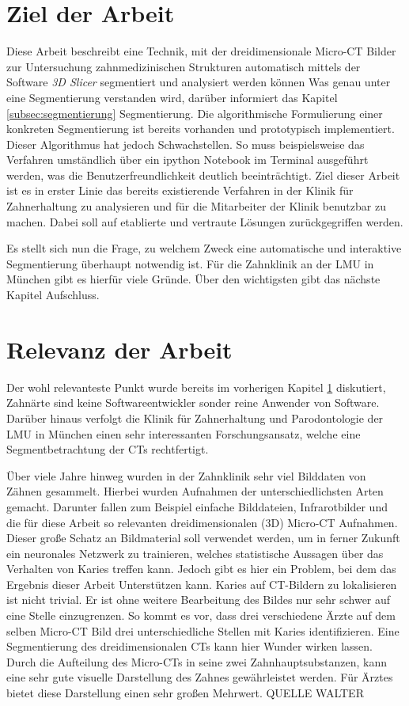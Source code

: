 \section{Ziel der Arbeit}
\label{sec:ziel_der_arbeit} Diese Arbeit beschreibt eine Technik, mit der
dreidimensionale Micro-CT Bilder zur Untersuchung zahnmedizinischen Strukturen
automatisch mittels der Software \textit{3D Slicer} segmentiert und analysiert werden
können Was genau unter eine Segmentierung verstanden wird, darüber informiert
das Kapitel \ref{subsec:segmentierung} Segmentierung. Die algorithmische Formulierung
einer konkreten Segmentierung ist bereits vorhanden und prototypisch implementiert.
Dieser Algorithmus hat jedoch Schwachstellen. So muss beispielsweise das Verfahren
umständlich über ein ipython Notebook im Terminal ausgeführt werden, was die
Benutzerfreundlichkeit deutlich beeinträchtigt. Ziel dieser Arbeit ist es in erster
Linie das bereits existierende Verfahren in der Klinik für Zahnerhaltung zu analysieren
und für die Mitarbeiter der Klinik benutzbar zu machen. Dabei soll auf
etablierte und vertraute Lösungen zurückgegriffen werden.

Es stellt sich nun die Frage, zu welchem Zweck eine automatische und interaktive
Segmentierung überhaupt notwendig ist. Für die Zahnklinik an der LMU in München
gibt es hierfür viele Gründe. Über den wichtigsten gibt das nächste Kapitel Aufschluss.

\section{Relevanz der Arbeit}
\label{sec:relevanz_der_arbeit} Der wohl relevanteste Punkt wurde bereits im vorherigen
Kapitel \ref{sec:ziel_der_arbeit} diskutiert, Zahnärte sind keine
Softwareentwickler sonder reine Anwender von Software. Darüber hinaus verfolgt die
Klinik für Zahnerhaltung und Parodontologie der LMU in München einen sehr interessanten
Forschungsansatz, welche eine Segmentbetrachtung der CTs rechtfertigt.

Über viele Jahre hinweg wurden in der Zahnklinik sehr viel Bilddaten von Zähnen
gesammelt. Hierbei wurden Aufnahmen der unterschiedlichsten Arten gemacht.
Darunter fallen zum Beispiel einfache Bilddateien, Infrarotbilder und die für diese
Arbeit so relevanten dreidimensionalen (3D) Micro-CT Aufnahmen. Dieser große
Schatz an Bildmaterial soll verwendet werden, um in ferner Zukunft ein neuronales
Netzwerk zu trainieren, welches statistische Aussagen über das Verhalten von
Karies treffen kann. Jedoch gibt es hier ein Problem, bei dem das Ergebnis
dieser Arbeit Unterstützen kann. Karies auf CT-Bildern zu lokalisieren ist nicht
trivial. Er ist ohne weitere Bearbeitung des Bildes nur sehr schwer auf eine
Stelle einzugrenzen. So kommt es vor, dass drei verschiedene Ärzte auf dem
selben Micro-CT Bild drei unterschiedliche Stellen mit Karies identifizieren. Eine
Segmentierung des dreidimensionalen CTs kann hier Wunder wirken lassen. Durch
die Aufteilung des Micro-CTs in seine zwei Zahnhauptsubstanzen, kann eine sehr gute
visuelle Darstellung des Zahnes gewährleistet werden. Für Ärztes bietet diese
Darstellung einen sehr großen Mehrwert. QUELLE WALTER


